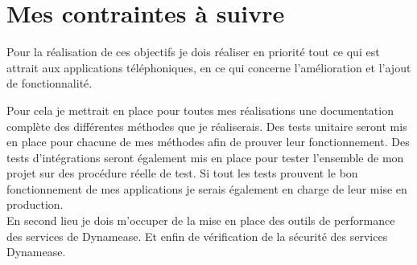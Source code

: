 \section{Mes contraintes à suivre}

Pour la réalisation de ces objectifs je dois réaliser en priorité tout ce qui est attrait aux applications téléphoniques, en ce qui concerne l'amélioration et l'ajout de fonctionnalité.

Pour cela je mettrait en place pour toutes mes réalisations une documentation complète des différentes méthodes que je réaliserais. Des tests unitaire seront mis en place pour chacune de mes méthodes afin de prouver leur fonctionnement. Des tests d'intégrations seront également mis en place pour tester l'ensemble de mon projet sur des procédure réelle de test. Si tout les tests prouvent le bon fonctionnement de mes applications je serais également en charge de leur mise en production.\\

En second lieu je dois m'occuper de la mise en place des outils de performance des services de Dynamease. Et enfin de vérification de la sécurité des services Dynamease.